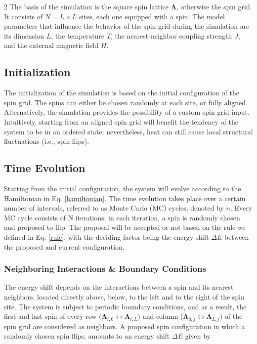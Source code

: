 \documentclass{article}
\begin{document}
\begin{multicols}{2}
The basis of the simulation is the square spin lattice $\boldsymbol{\Lambda}$, otherwise the spin grid. It consists of $N=L\times L$ sites, each one equipped with a spin. The model parameters that influence the behavior of the spin grid during the simulation are its dimension $L$, the temperature $T$, the nearest-neighbor coupling strength $J$, and the external magnetic field $H$. 

\subsection{Initialization}

The initialization of the simulation is based on the initial configuration of the spin grid. The spins can either be chosen randomly at each site, or fully aligned. Alternatively, the simulation provides the possibility of a custom spin grid input. Intuitively, starting from an aligned spin grid will benefit the tendency of the system to be in an ordered state; nevertheless, heat can still cause local structural fluctuations (i.e., spin flips).

\subsection{Time Evolution}

Starting from the initial configuration, the system will evolve according to the Hamiltonian in Eq. \eqref{hamiltonian}. The time evolution takes place over a certain number of intervals, referred to as Monte Carlo (MC) cycles, denoted by $n$. Every MC cycle consists of N iterations; in each iteration, a spin is randomly chosen and proposed to flip. The proposal will be accepted or not based on the rule we defined in Eq. \eqref{rule}, with the deciding factor being the energy shift $\Delta E$ between the proposed and current configuration. 

\subsubsection{Neighboring Interactions \& Boundary Conditions}

The energy shift depends on the interactions between a spin and its nearest neighbors, located directly above, below, to the left and to the right of the spin site. The system is subject to periodic boundary conditions, and as a result, the first and last spin of every row ($\boldsymbol{\Lambda}_{i,0} \leftrightarrow\boldsymbol{\Lambda}_{i,L}$) and column ($\boldsymbol{\Lambda}_{0,j} \leftrightarrow\boldsymbol{\Lambda}_{L,j}$) of the spin grid are considered as neighbors. A proposed spin configuration in which a randomly chosen spin flips, amounts to an energy shift $\Delta E$ given by


\end{multicols}
\end{document}
